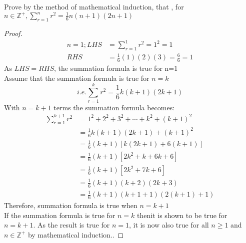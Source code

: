 \documentclass[a4paper]{article}
\begin{document}
\begin{eg}
Prove by the method of mathematical induction, that , for $n\in\mathbb{Z}^+ , \sum_{r=1}^nr^2=\frac{1}{6}n(n+1)(2n+1)$
\begin{proof}
\begin{align*}
n=1; LHS&=\sum_{r=1}^1r^2=1^2=1\\
RHS&=\frac{1}{6}(1)(2)(3)=\frac{6}{6}=1
\end{align*}
As $LHS=RHS$, the summation formula is true for n=1\\

Assume that the summation formula is true for $n=k$
\begin{equation*}
i.e.\sum_{r=1}^kr^2=\frac{1}{6}k(k+1)(2k+1)
\end{equation*}
With $n=k+1$ terms the summation formula becomes:
\begin{align*}
\sum_{r=1}^{k+1}r^2&=1^2+2^2+3^2+\cdots+k^2+(k+1)^2\\
&=\frac{1}{6}k(k+1)(2k+1)+(k+1)^2\\
&=\frac{1}{6}(k+1)[k(2k+1)+6(k+1)]\\
&=\frac{1}{6}(k+1)[2k^2+k+6k+6]\\
&=\frac{1}{6}(k+1)[2k^2+7k+6]\\
&=\frac{1}{6}(k+1)(k+2)(2k+3)\\
&=\frac{1}{6}(k+1)(k+1+1)(2(k+1)+1)
\end{align*}
Therefore, summation formula is true when $n=k+1$\\
If the summation formula is true for $n=k$ thenit is shown to be true for $n=k+1$. As the result is true for $n=1$, it is now also true for all $n\geq1$ and $n\in\mathbb{Z}^+$ by mathematical induction..
\end{proof}
\end{eg}
\end{document}
